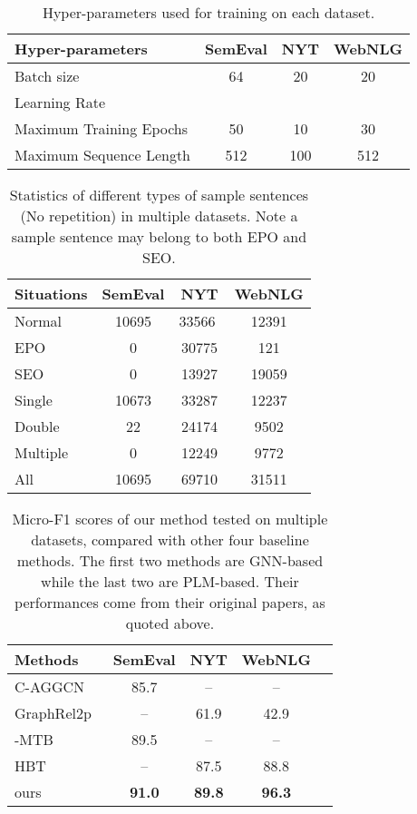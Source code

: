 \documentclass[11pt,a4paper]{article}
\begin{document}
\begin{table*}
\centering
\begin{tabular}{lccc}
\hline \textbf{Hyper-parameters} & \textbf{SemEval} & \textbf{NYT}&  \textbf{WebNLG}\\ \hline
Batch size   & 64 & 20 & 20 \\
Learning Rate &  &  &  \\
Maximum Training Epochs& 50 & 10 & 30 \\
Maximum Sequence Length & 512 & 100  & 512 \\
\hline
\end{tabular}
\caption{\label{para-tab} Hyper-parameters used for training on each dataset. }
\end{table*}
 \begin{table*}
\centering
\begin{tabular}{lccc}
\hline \textbf{Situations} & \textbf{SemEval} & \textbf{NYT}& \textbf{WebNLG}\\ \hline

Normal  & 10695 & 33566 ‬& 12391  \\
EPO  & 0 & 30775  & 121  \\
SEO & 0 & 13927 & 19059 \\
\hline
Single  & 10673 & 33287  & 12237  \\
Double  & 22 & 24174  & 9502  \\
Multiple & 0 & 12249  & 9772 \\
\hline
All & 10695 & 69710   & 31511 \\
\hline
\end{tabular}
\caption{\label{data-table} Statistics of different types of sample sentences (No repetition) in multiple datasets. Note a sample sentence may belong to both EPO and SEO. }
\end{table*}
\begin{table*}
\centering
\begin{tabular}{lcccc}
\hline \textbf{Methods} & \textbf{SemEval} & \textbf{NYT}& \textbf{WebNLG}\\ \hline
C-AGGCN~\cite{guo2019attention}   & 85.7 & -- & -- \\
GraphRel2p~\cite{fu2019graphrel} & -- & 61.9 & 42.9 \\
\hline
-MTB ~\cite{soares2019matching}& 89.5 & -- & --\\
HBT~\cite{wei2019novel} & -- & 87.5& 88.8 \\
\hline
ours & \textbf{91.0} & \textbf{89.8}  & \textbf{96.3}  \\
\hline
\end{tabular}
\caption{\label{preformance-table} Micro-F1 scores of our method tested on multiple datasets, compared with other four baseline methods. The first two methods are GNN-based while the last two are PLM-based. Their performances come from their original papers, as quoted above. }
\end{table*}
\end{document}
